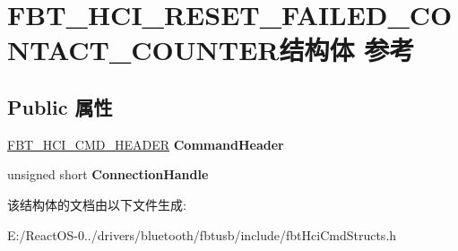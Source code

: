 \hypertarget{struct_f_b_t___h_c_i___r_e_s_e_t___f_a_i_l_e_d___c_o_n_t_a_c_t___c_o_u_n_t_e_r}{}\section{F\+B\+T\+\_\+\+H\+C\+I\+\_\+\+R\+E\+S\+E\+T\+\_\+\+F\+A\+I\+L\+E\+D\+\_\+\+C\+O\+N\+T\+A\+C\+T\+\_\+\+C\+O\+U\+N\+T\+E\+R结构体 参考}
\label{struct_f_b_t___h_c_i___r_e_s_e_t___f_a_i_l_e_d___c_o_n_t_a_c_t___c_o_u_n_t_e_r}
\subsection*{Public 属性}
\begin{DoxyCompactItemize}
\item 
\mbox{\label{struct_f_b_t___h_c_i___r_e_s_e_t___f_a_i_l_e_d___c_o_n_t_a_c_t___c_o_u_n_t_e_r_a7152de972ef6cd26834c0bd7f56a1c94}} 
\hyperlink{struct_f_b_t___h_c_i___c_m_d___h_e_a_d_e_r}{F\+B\+T\+\_\+\+H\+C\+I\+\_\+\+C\+M\+D\+\_\+\+H\+E\+A\+D\+ER} {\bfseries Command\+Header}
\item 
\mbox{\label{struct_f_b_t___h_c_i___r_e_s_e_t___f_a_i_l_e_d___c_o_n_t_a_c_t___c_o_u_n_t_e_r_a3388b4ff174e15f6472181e7cab8dec3}} 
unsigned short {\bfseries Connection\+Handle}
\end{DoxyCompactItemize}


该结构体的文档由以下文件生成\+:\begin{DoxyCompactItemize}
\item 
E\+:/\+React\+O\+S-\/0../drivers/bluetooth/fbtusb/include/fbt\+Hci\+Cmd\+Structs.\+h\end{DoxyCompactItemize}
